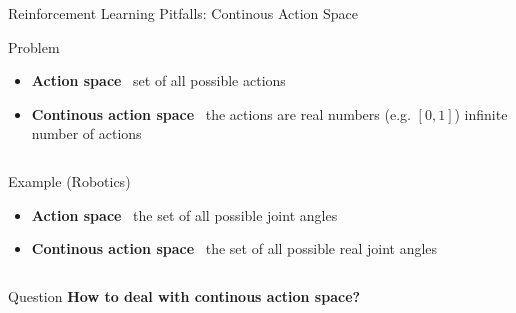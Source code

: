 \documentclass[presentation, 9pt]{beamer}\mode<presentation>{\usetheme{AMSBolognaFC}}
\begin{document}
\begin{frame}{Reinforcement Learning Pitfalls: Continous Action Space}
	\begin{block}{Problem}
		\begin{itemize}
			\item \textbf{Action space} \faArrowRight \, set of all possible actions
			\item \textbf{Continous action space} \faArrowRight \, the actions are real numbers (e.g. $[0,1]$) \faArrowRight infinite number of actions
		\end{itemize}
	\end{block}
	\begin{columns}
		\begin{column}{0.5\textwidth}
			\begin{block}{Example (Robotics) \, \href{}{\faLink}}
				\begin{itemize}
					\item \textbf{Action space} \faArrowRight \, the set of all possible joint angles
					\item \textbf{Continous action space} \faArrowRight \, the set of all possible real joint angles
				\end{itemize}
			\end{block}
		\end{column}
		\begin{column}{0.5\textwidth}
			\centering
		\end{column}
	\end{columns}
	
	\begin{alertblock}{Question}
		\centering
		\textbf{How to deal with continous action space?}
	\end{alertblock}
\end{frame}
\end{document}
